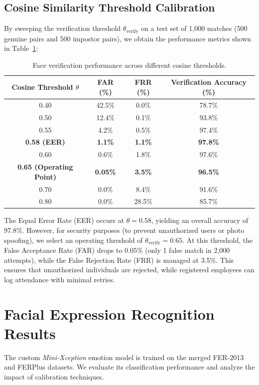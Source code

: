\subsection{Cosine Similarity Threshold Calibration}
By sweeping the verification threshold $\theta_{\text{verify}}$ on a test set of 1,000 matches (500 genuine pairs and 500 impostor pairs), we obtain the performance metrics shown in Table~\ref{tab:threshold-sweep}:
\begin{table}[H]
\centering
\caption{Face verification performance across different cosine thresholds.}
\label{tab:threshold-sweep}
\begin{tabular}{cccc}
\toprule
\textbf{Cosine Threshold $\theta$} & \textbf{FAR (\%)} & \textbf{FRR (\%)} & \textbf{Verification Accuracy (\%)} \\
\midrule
0.40 & 42.5\% & 0.0\% & 78.7\% \\
0.50 & 12.4\% & 0.1\% & 93.8\% \\
0.55 & 4.2\% & 0.5\% & 97.4\% \\
\textbf{0.58 (EER)} & \textbf{1.1\%} & \textbf{1.1\%} & \textbf{97.8\%} \\
0.60 & 0.6\% & 1.8\% & 97.6\% \\
\textbf{0.65 (Operating Point)} & \textbf{0.05\%} & \textbf{3.5\%} & \textbf{96.5\%} \\
0.70 & 0.0\% & 8.4\% & 91.6\% \\
0.80 & 0.0\% & 28.5\% & 85.7\% \\
\bottomrule
\end{tabular}
\end{table}

The Equal Error Rate (EER) occurs at $\theta = 0.58$, yielding an overall accuracy of 97.8\%. However, for security purposes (to prevent unauthorized users or photo spoofing), we select an operating threshold of $\theta_{\text{verify}} = 0.65$. At this threshold, the False Acceptance Rate (FAR) drops to 0.05\% (only 1 false match in 2,000 attempts), while the False Rejection Rate (FRR) is managed at 3.5\%. This ensures that unauthorized individuals are rejected, while registered employees can log attendance with minimal retries.

\section{Facial Expression Recognition Results}
The custom \textit{Mini-Xception} emotion model is trained on the merged FER-2013 and FERPlus datasets. We evaluate its classification performance and analyze the impact of calibration techniques.

